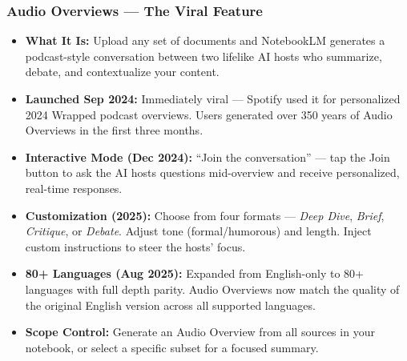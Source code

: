 \begin{frame}[fragile]\frametitle{Audio Overviews — The Viral Feature}
  \begin{itemize}
    \item \textbf{What It Is:} Upload any set of documents and NotebookLM generates a podcast-style conversation between two lifelike AI hosts who summarize, debate, and contextualize your content.
    \item \textbf{Launched Sep 2024:} Immediately viral — Spotify used it for personalized 2024 Wrapped podcast overviews. Users generated over 350 years of Audio Overviews in the first three months.
    \item \textbf{Interactive Mode (Dec 2024):} ``Join the conversation'' — tap the Join button to ask the AI hosts questions mid-overview and receive personalized, real-time responses.
    \item \textbf{Customization (2025):} Choose from four formats — \textit{Deep Dive}, \textit{Brief}, \textit{Critique}, or \textit{Debate}. Adjust tone (formal/humorous) and length. Inject custom instructions to steer the hosts' focus.
    \item \textbf{80+ Languages (Aug 2025):} Expanded from English-only to 80+ languages with full depth parity. Audio Overviews now match the quality of the original English version across all supported languages.
    \item \textbf{Scope Control:} Generate an Audio Overview from all sources in your notebook, or select a specific subset for a focused summary.
  \end{itemize}
\end{frame}

